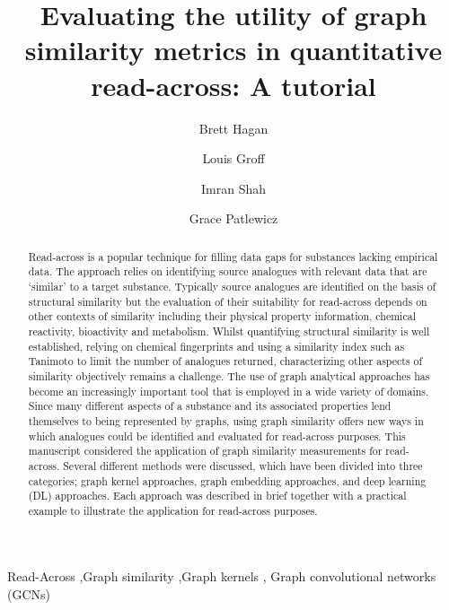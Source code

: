 \documentclass[
  super,
  preprint,
  3p]{elsarticle}
\begin{document}
\begin{frontmatter}
\title{Evaluating the utility of graph similarity metrics in
quantitative read-across: A tutorial}
\author[1,2]{Brett Hagan%
%
}

\author[2]{Louis Groff%
%
}

\author[2]{Imran Shah%
%
}

\author[]{Grace Patlewicz%
%
}






        
\begin{abstract}
Read-across is a popular technique for filling data gaps for substances
lacking empirical data. The approach relies on identifying source
analogues with relevant data that are `similar' to a target substance.
Typically source analogues are identified on the basis of structural
similarity but the evaluation of their suitability for read-across
depends on other contexts of similarity including their physical
property information, chemical reactivity, bioactivity and metabolism.
Whilst quantifying structural similarity is well established, relying on
chemical fingerprints and using a similarity index such as Tanimoto to
limit the number of analogues returned, characterizing other aspects of
similarity objectively remains a challenge. The use of graph analytical
approaches has become an increasingly important tool that is employed in
a wide variety of domains. Since many different aspects of a substance
and its associated properties lend themselves to being represented by
graphs, using graph similarity offers new ways in which analogues could
be identified and evaluated for read-across purposes. This manuscript
considered the application of graph similarity measurements for
read-across. Several different methods were discussed, which have been
divided into three categories; graph kernel approaches, graph embedding
approaches, and deep learning (DL) approaches. Each approach was
described in brief together with a practical example to illustrate the
application for read-across purposes.
\end{abstract}





\begin{keyword}
    Read-Across \sep Graph similarity \sep Graph kernels \sep 
    Graph convolutional networks (GCNs)
\end{keyword}
\end{frontmatter}
    
\end{document}
